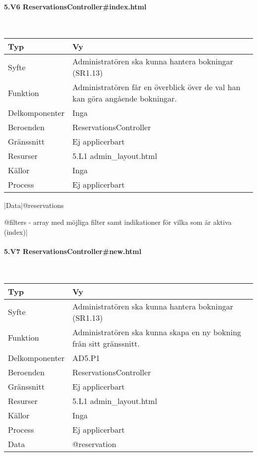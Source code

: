\documentclass[a4paper, twoside, 11pt, titlepage]{article}
\begin{document}
			\paragraph{5.V6 ReservationsController\#index.html}\

			\begin {table} [ht] \begin{tabular} {  p{3.5cm} p{9.6cm} }
				\hline
				Typ & Vy  \\
				\hline
				Syfte & Administratören ska kunna hantera bokningar (SR1.13)  \\
				\hline
				Funktion & Administratören får en överblick över de val han kan göra angående bokningar.  \\
				\hline
				Delkomponenter & Inga  \\
				\hline
				Beroenden & ReservationsController  \\
				\hline
				Gränssnitt & Ej applicerbart  \\
				\hline
				Resurser & 5.L1 admin\_layout.html  \\
				\hline
				Källor & Inga  \\
				\hline
				Process & Ej applicerbart  \\
				\hline
			\end{tabular} \end{table} \FloatBarrier
			\vspace{6mm}

			|Data|@reservations

			@filters - array med möjliga filter samt indikationer för vilka som är aktiva (index)|

			\paragraph{5.V7 ReservationsController\#new.html}\

			\begin {table} [ht] \begin{tabular} {  p{3.5cm} p{9.6cm} }
				\hline
				Typ & Vy  \\
				\hline
				Syfte & Administratören ska kunna hantera bokningar (SR1.13)  \\
				\hline
				Funktion & Administratören ska kunna skapa en ny bokning från sitt gränssnitt.  \\
				\hline
				Delkomponenter & AD5.P1  \\
				\hline
				Beroenden & ReservationsController  \\
				\hline
				Gränssnitt & Ej applicerbart  \\
				\hline
				Resurser & 5.L1 admin\_layout.html  \\
				\hline
				Källor & Inga  \\
				\hline
				Process & Ej applicerbart  \\
				\hline
				Data & @reservation  \\
				\hline
			\end{tabular} \end{table} \FloatBarrier
\end{document}
